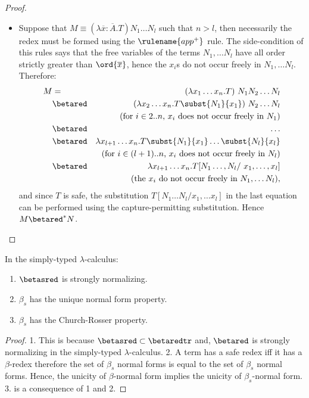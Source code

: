 \begin{proof}
\begin{itemize}
\item
 Suppose that $M \equiv (\lambda \overline{x} : \overline{A} . T) N_1 \ldots N_l$ such that $n> l$, then necessarily
the redex must be formed using the $\rulename{app^+}$ rule. The
side-condition of this rules says that the free variables of the
terms $N_1, \ldots N_l$ have all order strictly greater than
$\ord{\overline{x}}$, hence the $x_i$s do not occur freely in $N_1,
\ldots N_l$. Therefore:
\begin{eqnarray*}
 M &=& (\lambda x_1 \ldots x_n .T) \ N_1  N_2 \ldots N_l  \\
     &\betared& (\lambda x_2 \ldots x_n .T \subst{N_1}{x_1} ) \ N_2 \ldots N_l \\
            && \mbox{(for $i \in 2..n$, $x_i$ does not occur freely in $N_1$)}\\
    &\betared& \ldots \\
    &\betared& \lambda x_{l+1} \ldots x_n . T \subst{N_1}{x_1}  \ldots \subst{N_l}{x_l} \\
        && \mbox{(for $i \in (l+1)..n$,  $x_i$ does not occur freely in $N_l$)}\\
    &\betared& \lambda x_{l+1} \ldots x_n . T [N_1\ldots, N_l /  \ x_1,\ldots, x_l] \\
        && \mbox{(the $x_i$ do not occur freely in $N_1, \ldots
        N_l$)},
\end{eqnarray*}
and since $T$ is safe, the substitution $T [N_1\ldots N_l/x_1,\ldots
x_l]$ in the last equation can be performed using the
capture-permitting substitution. Hence $M \betared^* N$.
\end{itemize}
\end{proof}

\begin{property} In the simply-typed $\lambda$-calculus:
\begin{enumerate}
\item $\betasred$ is strongly normalizing.
\item $\beta_s$ has the unique normal form property.
\item $\beta_s$ has the Church-Rosser property.
\end{enumerate}
\end{property}

\begin{proof}
1. This is because $\betasred \subset \betaredtr$ and, $\betared$ is
strongly normalizing in the simply-typed $\lambda$-calculus. 2. A
term has a safe redex iff it has a $\beta$-redex therefore the set
of $\beta_s$ normal forms is equal to the set of $\beta_s$ normal
forms. Hence, the unicity of $\beta$-normal form implies the unicity
of $\beta_s$-normal form. 3. is a consequence of 1 and 2.
\end{proof}


